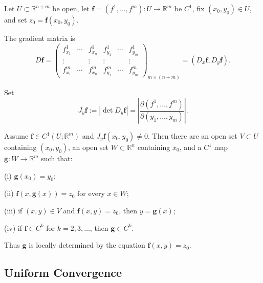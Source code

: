 Let $U\subset\mathbb R^{n+m}$ be open, let $\mathbf f=(f^1,\ldots,f^m):U\to\mathbb R^m$ be $C^1$, fix $(x_0,y_0)\in U$, and set $z_0=\mathbf f(x_0,y_0)$.

\begin{definition}
\label{def:gradient-matrix-df-rectangular-notation}
The gradient matrix is
\[
D\mathbf f
=\begin{pmatrix}
f^1_{x_1}&\cdots&f^1_{x_n}&f^1_{y_1}&\cdots&f^1_{y_m}\\
\vdots&&\vdots&\vdots&&\vdots\\
f^m_{x_1}&\cdots&f^m_{x_n}&f^m_{y_1}&\cdots&f^m_{y_m}
\end{pmatrix}_{m\times(n+m)}
=(D_x\mathbf f,D_y\mathbf f).
\]
\end{definition}

\begin{definition}
\label{def:jacobian-jyf}
Set
\[
J_y\mathbf f
:=|\det D_y\mathbf f|
=\left|\frac{\partial(f^1,\ldots,f^m)}
{\partial(y_1,\ldots,y_m)}\right|.
\]
\end{definition}

\begin{theorem}
\label{thm:implicit-function-theorem}
Assume $\mathbf f\in C^1(U;\mathbb R^m)$ and $J_y\mathbf f(x_0,y_0)\ne0$. Then there are an open set $V\subset U$ containing $(x_0,y_0)$, an open set $W\subset\mathbb R^n$ containing $x_0$, and a $C^1$ map $\mathbf g:W\to\mathbb R^m$ such that:

(i) $\mathbf g(x_0)=y_0$;

(ii) $\mathbf f(x,\mathbf g(x))=z_0$ for every $x\in W$;

(iii) if $(x,y)\in V$ and $\mathbf f(x,y)=z_0$, then $y=\mathbf g(x)$;

(iv) if $\mathbf f\in C^k$ for $k=2,3,\ldots$, then $\mathbf g\in C^k$.

Thus $\mathbf g$ is locally determined by the equation $\mathbf f(x,y)=z_0$.
\end{theorem}

\subsection{Uniform Convergence}

